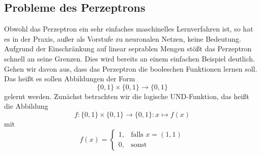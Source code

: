\documentclass[fontsize=11pt]{scrartcl}
\begin{document}
            \subsection{Probleme des Perzeptrons}
                    Obwohl das Perzeptron ein sehr einfaches maschinelles Lernverfahren ist, so hat es in der Praxis, außer als Vorstufe zu neuronalen Netzen, keine Bedeutung. Aufgrund der Einschränkung auf linear seprablen Mengen stößt das Perzeptron schnell an seine Grenzen.
                    Dies wird bereits an einem einfachen Beispiel deutlich.
                    \newline
                    Gehen wir davon aus, dass das Perzeptron die booleschen Funktionen lernen soll. Das heißt es sollen Abbildungen der Form $$\{0,1\}\times\{0,1\} \rightarrow \{0,1\}$$ gelernt werden.
                    Zunächst betrachten wir die logische UND-Funktion, das heißt die Abbildung
                    $$
                        f:\{0,1\}\times\{0,1\}\rightarrow\{0,1\}: x\mapsto f(x)
                    $$
                    mit
                    $$
                        f(x)=\left\{\begin{array}{cl} 1, & \mbox{falls }x=(1,1)\\
                        0, & \mbox{sonst}\end{array}\right. 
                    $$
\end{document}
